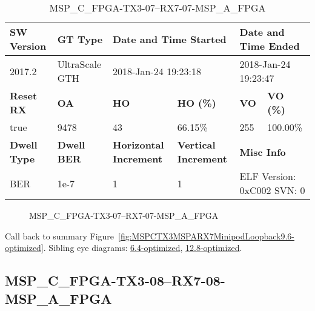 \begin{table}[h]
\centering
\caption{MSP\_C\_FPGA-TX3-07--RX7-07-MSP\_A\_FPGA}
\label{tab:MSPCFPGATX307RX707MSPAFPGA9.6-optimized}
\begin{tabular}{@{}|l|l|l|l|l|l|@{}}
\toprule
\textbf{SW Version}                & \textbf{GT Type}   & \multicolumn{2}{l|}{\textbf{Date and Time Started}}            & \multicolumn{2}{l|}{\textbf{Date and Time Ended}}        \\ \midrule
2017.2                       & UltraScale GTH          & \multicolumn{2}{l|}{2018-Jan-24 19:23:18}                   & \multicolumn{2}{l|}{2018-Jan-24 19:23:47}               \\ \midrule
\textbf{Reset RX}                  & \textbf{OA} & \textbf{HO}   & \textbf{HO (\%)} & \textbf{VO} & \textbf{VO (\%)} \\ \midrule
true & 9478        & 43          & 66.15\%        & 255        & 100.00\%       \\ \midrule
\textbf{Dwell Type}                & \textbf{Dwell BER} & \textbf{Horizontal Increment} & \textbf{Vertical Increment}    & \multicolumn{2}{l|}{\textbf{Misc Info}}                  \\ \midrule
BER                            & 1e-7        & 1        & 1           & \multicolumn{2}{l|}{ELF Version: 0xC002 SVN: 0}                         \\ \bottomrule
\end{tabular}
\end{table}

\begin{figure}[h]
\caption{MSP\_C\_FPGA-TX3-07--RX7-07-MSP\_A\_FPGA} \label{fig:MSPCFPGATX307RX707MSPAFPGA9.6-optimized}
\end{figure}

Call back to summary Figure~\ref{fig:MSPCTX3MSPARX7MinipodLoopback9.6-optimized}.
Sibling eye diagrams: \hyperref[sec:MSPCFPGATX307RX707MSPAFPGA6.4-optimized]{6.4-optimized}, \hyperref[sec:MSPCFPGATX307RX707MSPAFPGA12.8-optimized]{12.8-optimized}.

\clearpage
\newpage


\subsection{MSP\_C\_FPGA-TX3-08--RX7-08-MSP\_A\_FPGA}\label{sec:MSPCFPGATX308RX708MSPAFPGA9.6-optimized}

